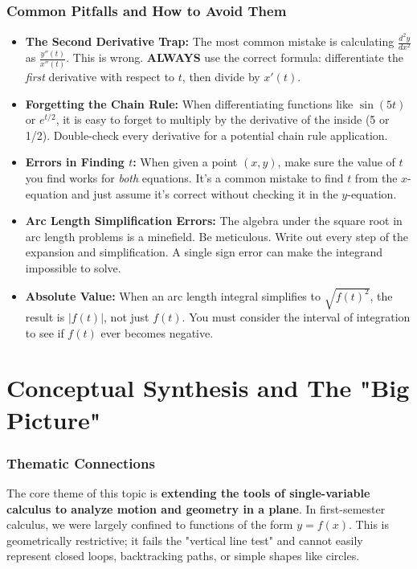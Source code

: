 \documentclass{article}
\begin{document}
\section{Common Pitfalls and How to Avoid Them}
\begin{itemize}
    \item \textbf{The Second Derivative Trap:} The most common mistake is calculating $\frac{d^2y}{dx^2}$ as $\frac{y''(t)}{x''(t)}$. This is wrong. \textbf{ALWAYS} use the correct formula: differentiate the \textit{first} derivative with respect to $t$, then divide by $x'(t)$.
    \item \textbf{Forgetting the Chain Rule:} When differentiating functions like $\sin(5t)$ or $e^{t/2}$, it is easy to forget to multiply by the derivative of the inside (5 or 1/2). Double-check every derivative for a potential chain rule application.
    \item \textbf{Errors in Finding $t$:} When given a point $(x,y)$, make sure the value of $t$ you find works for \textit{both} equations. It's a common mistake to find $t$ from the $x$-equation and just assume it's correct without checking it in the $y$-equation.
    \item \textbf{Arc Length Simplification Errors:} The algebra under the square root in arc length problems is a minefield. Be meticulous. Write out every step of the expansion and simplification. A single sign error can make the integrand impossible to solve.
    \item \textbf{Absolute Value:} When an arc length integral simplifies to $\sqrt{f(t)^2}$, the result is $|f(t)|$, not just $f(t)$. You must consider the interval of integration to see if $f(t)$ ever becomes negative.
\end{itemize}

\part{Conceptual Synthesis and The "Big Picture"}

\section{Thematic Connections}
The core theme of this topic is \textbf{extending the tools of single-variable calculus to analyze motion and geometry in a plane}. In first-semester calculus, we were largely confined to functions of the form $y=f(x)$. This is geometrically restrictive; it fails the "vertical line test" and cannot easily represent closed loops, backtracking paths, or simple shapes like circles.
\end{document}

